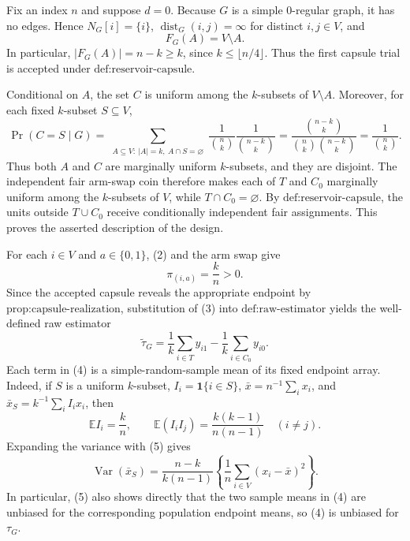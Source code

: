 Fix an index \(n\) and suppose \(d=0\).  Because \(G\) is a simple \(0\)-regular graph, it has no edges.  Hence \(N_G[i]=\{i\}\), \(\operatorname{dist}_G(i,j)=\infty\) for distinct \(i,j\in V\), and
\[
F_G(A)=V\setminus A. \tag{1}
\]
In particular, \(|F_G(A)|=n-k\ge k\), since \(k\le\lfloor n/4\rfloor\).  Thus the first capsule trial is accepted under \(\text{def:reservoir-capsule}\).

Conditional on \(A\), the set \(C\) is uniform among the \(k\)-subsets of \(V\setminus A\).  Moreover, for each fixed \(k\)-subset \(S\subseteq V\),
\[
\Pr(C=S\mid G)
=\sum_{\substack{A\subseteq V:\ |A|=k,\ A\cap S=\varnothing}}
 \frac{1}{\binom nk}\frac{1}{\binom{n-k}{k}}
=\frac{\binom{n-k}{k}}{\binom nk\binom{n-k}{k}}
=\frac1{\binom nk}. \tag{2}
\]
Thus both \(A\) and \(C\) are marginally uniform \(k\)-subsets, and they are disjoint.  The independent fair arm-swap coin therefore makes each of \(T\) and \(C_0\) marginally uniform among the \(k\)-subsets of \(V\), while \(T\cap C_0=\varnothing\).  By \(\text{def:reservoir-capsule}\), the units outside \(T\cup C_0\) receive conditionally independent fair assignments.  This proves the asserted description of the design.

For each \(i\in V\) and \(a\in\{0,1\}\), (2) and the arm swap give
\[
\pi_{(i,a)}=\frac{k}{n}>0. \tag{3}
\]
Since the accepted capsule reveals the appropriate endpoint by \(\text{prop:capsule-realization}\), substitution of (3) into \(\text{def:raw-estimator}\) yields the well-defined raw estimator
\[
\widetilde\tau_G
=\frac1k\sum_{i\in T}y_{i1}-\frac1k\sum_{i\in C_0}y_{i0}. \tag{4}
\]
Each term in (4) is a simple-random-sample mean of its fixed endpoint array.  Indeed, if \(S\) is a uniform \(k\)-subset, \(I_i=\mathbf 1\{i\in S\}\), \(\bar x=n^{-1}\sum_i x_i\), and \(\bar x_S=k^{-1}\sum_i I_i x_i\), then
\[
\mathbb E I_i=\frac{k}{n},\qquad
\mathbb E(I_iI_j)=\frac{k(k-1)}{n(n-1)}\quad(i\ne j). \tag{5}
\]
Expanding the variance with (5) gives
\[
\operatorname{Var}(\bar x_S)
=\frac{n-k}{k(n-1)}\left\{\frac1n\sum_{i\in V}(x_i-\bar x)^2\right\}. \tag{6}
\]
In particular, (5) also shows directly that the two sample means in (4) are unbiased for the corresponding population endpoint means, so (4) is unbiased for \(\tau_G\).


